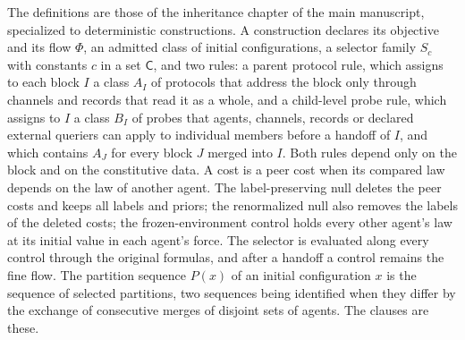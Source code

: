 \documentclass[11pt,letterpaper]{report}
\begin{document}
The definitions are those of the inheritance chapter of the main manuscript, specialized to deterministic constructions. A construction declares its objective and its flow $\Phi$, an admitted class of initial configurations, a selector family $S_c$ with constants $c$ in a set $\mathsf C$, and two rules: a parent protocol rule, which assigns to each block $I$ a class $A_I$ of protocols that address the block only through channels and records that read it as a whole, and a child-level probe rule, which assigns to $I$ a class $B_I$ of probes that agents, channels, records or declared external queriers can apply to individual members before a handoff of $I$, and which contains $A_J$ for every block $J$ merged into $I$. Both rules depend only on the block and on the constitutive data. A cost is a peer cost when its compared law depends on the law of another agent. The label-preserving null deletes the peer costs and keeps all labels and priors; the renormalized null also removes the labels of the deleted costs; the frozen-environment control holds every other agent's law at its initial value in each agent's force. The selector is evaluated along every control through the original formulas, and after a handoff a control remains the fine flow. The partition sequence $P(x)$ of an initial configuration $x$ is the sequence of selected partitions, two sequences being identified when they differ by the exchange of consecutive merges of disjoint sets of agents. The clauses are these.
\end{document}
